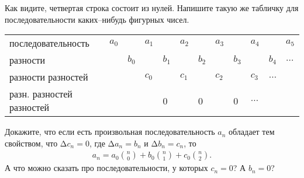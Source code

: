 \begin{itemize}
Как видите, четвертая строка состоит из нулей. Напишите такую же табличку для последовательности каких--нибудь фигурных чисел. 

\begin{center} \scriptsize \begin{tabular}{llllllllllll}
	\hline
	{\tiny последовательность} & $a_0$ & & $a_1$ & & $a_2$ & & $a_3$
		& & $a_4$ & & $a_5$ \\
	{\tiny разности} & & $b_0$ & & $b_1$ & & $b_2$ & & $b_3$ & & $b_4$ & $\ldots$ \\
	{\tiny разности разностей} & & & $c_0$ & & $c_1$ & & $c_2$ & & $c_3$ & $\ldots$ \\
	{\tiny разн. разностей разностей} & & & & 0 & & 0 & & 0 & $\ldots$ \\
	\hline
\end{tabular} \end{center} \medskip

Докажите, что если есть произвольная последовательность $a_n$ обладает тем свойством, что $\text{Δ} c_n = 0$, где $\text{Δ} a_n = b_n$ и $\text{Δ} b_n = c_n$, то
\begin{align*}
a_n = a_0 \binom{n}{0} + b_0 \binom{n}{1} + c_0 \binom{n}{2}.
\end{align*}
А что можно сказать про последовательности, у которых $c_n = 0$? А $b_n = 0$?
\end{itemize}